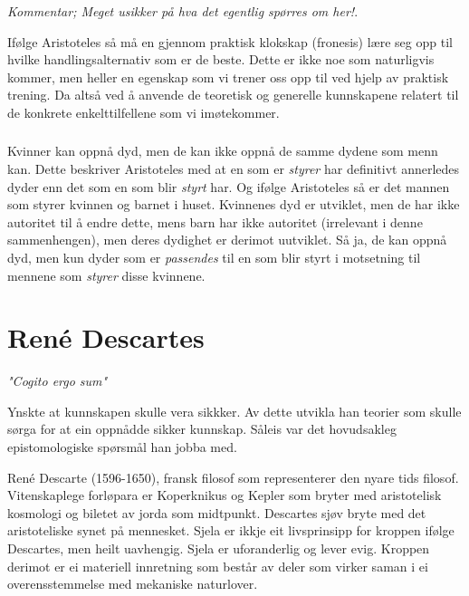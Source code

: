 \documentclass[a4paper]{IEEEtran}
\begin{document}
        \subsubsection{}
        \textit{Kommentar; Meget usikker på hva det egentlig spørres om her!}.

        Ifølge Aristoteles så må en gjennom praktisk klokskap (fronesis) lære 
        seg opp til hvilke handlingsalternativ som er de beste. Dette 
        er ikke noe som naturligvis kommer, men heller en egenskap som vi trener 
        oss opp til ved hjelp av praktisk trening. Da altså ved å anvende 
        de teoretisk og generelle kunnskapene relatert til de konkrete 
        enkelttilfellene som vi imøtekommer. \medskip 

        \subsubsection{}
        Kvinner kan oppnå dyd, men de kan ikke oppnå de samme dydene som menn kan. 
        Dette beskriver Aristoteles med at en som er \textit{styrer} har definitivt 
        annerledes dyder enn det som en som blir \textit{styrt} har. Og ifølge 
        Aristoteles så er det mannen som styrer kvinnen og barnet i huset. 
        Kvinnenes dyd er utviklet, men de har ikke autoritet til å endre dette, 
        mens barn har ikke autoritet (irrelevant i denne sammenhengen), men deres 
        dydighet er derimot uutviklet. Så ja, de kan oppnå dyd, men kun dyder som 
        er \textit{passendes} til en som blir styrt i motsetning til mennene som
        \textit{styrer} disse kvinnene.


\bigskip
\section{René Descartes}
\label{descartes}\bigskip
\begin{center}
    \textit{"Cogito ergo sum"}\bigskip    
\end{center}


Ynskte at kunnskapen skulle vera sikkker. Av dette utvikla han teorier som skulle sørga for at ein oppnådde sikker kunnskap. Såleis var det hovudsakleg epistomologiske spørsmål han jobba med.\bigskip

René Descarte (1596-1650), fransk filosof som representerer den nyare tids filosof. Vitenskaplege forløpara er Koperknikus og Kepler som bryter med aristotelisk kosmologi og biletet av jorda som midtpunkt. Descartes sjøv bryte med det aristoteliske synet på mennesket. Sjela er ikkje eit livsprinsipp for kroppen ifølge Descartes, men heilt uavhengig. Sjela er uforanderlig og lever evig. Kroppen derimot er ei materiell innretning som består av deler som virker saman i ei overensstemmelse med mekaniske naturlover.\bigskip
\end{document}
